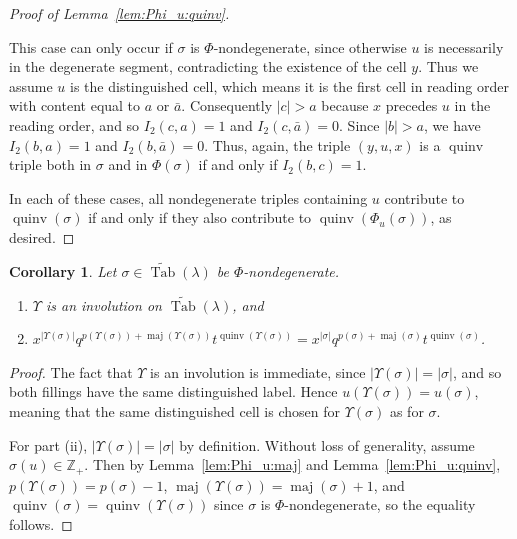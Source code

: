 \documentclass[11pt]{article}
\newtheorem{corollary}[theo]{Corollary}
\theoremstyle{definition}
\numberwithin{equation}{section}
\DeclareMathOperator{\PQT}{Tab}
\DeclareMathOperator{\maj}{maj}
\DeclareMathOperator{\quinv}{quinv}
\newcommand\cellL[4]{
\def\i{#1} \def\j{#2} \def\entry{#3} \def\labl{#4}
\draw (\j-1,-\i)--(\j,-\i)--(\j,-\i+1)--(\j-1,-\i+1)--(\j-1,-\i);
\node at (\j-.5,-\i+.5) {\entry};
\node at (\j-1.3,-\i+.8) {\tiny\labl};
}
\begin{document}
\begin{proof}[Proof of Lemma~\ref{lem:Phi_u:quinv}]
\begin{flushleft}
\end{flushleft}
This case can only occur if $\sigma$ is $\Phi$-nondegenerate, since otherwise $u$ is necessarily in the degenerate segment, contradicting the existence of the cell $y$. Thus we assume $u$ is the distinguished cell, which means it is the first cell in reading order with content equal to $a$ or $\bar{a}$. Consequently $|c|>a$ because $x$ precedes $u$ in the reading order, and so $I_2(c,a)=1$ and $I_2(c,\bar{a})=0$. Since $|b|>a$, we have $I_2(b,a)=1$ and $I_2(b,\bar{a})=0$. Thus, again, the triple $(y,u,x)$ is a $\quinv$ triple both in $\sigma$ and in $\Phi(\sigma)$ if and only if $I_2(b,c)=1$.

In each of these cases, all nondegenerate triples containing $u$ contribute to $\quinv(\sigma)$ if and only if they also contribute to $\quinv(\Phi_u(\sigma))$, as desired.
\end{proof}

\begin{corollary}\label{cor:nondegenerate}
Let $\sigma\in\widetilde{\PQT}(\lambda)$ be $\Phi$-nondegenerate.
\begin{enumerate}[label=(\roman*)]
\item $\Upsilon$ is an involution on $\widetilde{\PQT}(\lambda)$, and
\item $x^{|\Upsilon(\sigma)|} q^{p(\Upsilon(\sigma))+\maj(\Upsilon(\sigma))}t^{\quinv(\Upsilon(\sigma))} = x^{|\sigma|} q^{p(\sigma)+\maj(\sigma)}t^{\quinv(\sigma)}$.
\end{enumerate}
\end{corollary}

\begin{proof}
The fact that $\Upsilon$ is an involution is immediate, since $|\Upsilon(\sigma)|=|\sigma|$, and so both fillings have the same distinguished label. Hence $u(\Upsilon(\sigma))=u(\sigma)$, meaning that the same distinguished cell is chosen for $\Upsilon(\sigma)$ as for $\sigma$.

For part (ii), $|\Upsilon(\sigma)|=|\sigma|$ by definition. Without loss of generality, assume $\sigma(u)\in\mathbb{Z}_+$. Then by Lemma~\ref{lem:Phi_u:maj} and Lemma~\ref{lem:Phi_u:quinv},  $p(\Upsilon(\sigma))=p(\sigma)-1$, $\maj(\Upsilon(\sigma)) = \maj(\sigma)+1$, and $\quinv(\sigma)=\quinv(\Upsilon(\sigma))$ since $\sigma$ is $\Phi$-nondegenerate, so the equality follows.
\end{proof}
\end{document}
